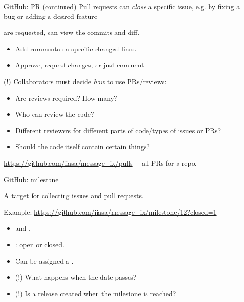 \documentclass[12pt,aspectratio=169]{beamer}
\begin{document}
\begin{frame}{GitHub: PR (continued)}
  Pull requests can \emph{close} a specific issue, e.g. by fixing a bug or adding a desired feature.

  \bigskip
   are requested, can view the commits and diff.
  \begin{itemize}
    \item Add comments on specific changed lines.
    \item Approve, request changes, or just comment.
  \end{itemize}

  \bigskip
  \alert{(!)} Collaborators must decide \emph{how} to use PRs/reviews:

  \begin{itemize}
    \item Are reviews required? How many?
    \item Who can review the code?
    \item Different reviewers for different parts of code/types of issues or PRs?
    \item Should the code itself contain certain things?
  \end{itemize}

  \smallskip
  \hspace{2em} \url{https://github.com/iiasa/message_ix/pulls} —all PRs for a repo.

\end{frame}

\begin{frame}{GitHub: milestone}

  {\Large A target for collecting issues and pull requests.}

  \bigskip
  Example: \url{https://github.com/iiasa/message_ix/milestone/12?closed=1}

  \begin{itemize}
    \item {} and .
    \item {}: open or closed.
    \item Can be assigned a .
    \item \alert{(!)} What happens when the date passes?
    \item \alert{(!)} Is a release created when the milestone is reached?
  \end{itemize}

\end{frame}
\end{document}
